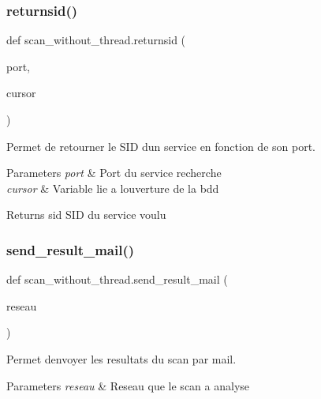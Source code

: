 \subsubsection{\texorpdfstring{returnsid()}{returnsid()}}
{\footnotesize\ttfamily def scan\+\_\+without\+\_\+thread.\+returnsid (\begin{DoxyParamCaption}\item[{}]{port,  }\item[{}]{cursor }\end{DoxyParamCaption})}



Permet de retourner le S\+ID d\textquotesingle{}un service en fonction de son port. 


\begin{DoxyParams}{Parameters}
{\em port} & Port du service recherche \\
\hline
{\em cursor} & Variable lie a l\textquotesingle{}ouverture de la bdd \\
\hline
\end{DoxyParams}
\begin{DoxyReturn}{Returns}
sid S\+ID du service voulu 
\end{DoxyReturn}
\hypertarget{namespacescan__without__thread_adc66d25732d159cb57f0e3aaf5e71e50}{}\label{namespacescan__without__thread_adc66d25732d159cb57f0e3aaf5e71e50} 
\subsubsection{\texorpdfstring{send\+\_\+result\+\_\+mail()}{send\_result\_mail()}}
{\footnotesize\ttfamily def scan\+\_\+without\+\_\+thread.\+send\+\_\+result\+\_\+mail (\begin{DoxyParamCaption}\item[{}]{reseau }\end{DoxyParamCaption})}



Permet d\textquotesingle{}envoyer les resultats du scan par mail. 


\begin{DoxyParams}{Parameters}
{\em reseau} & Reseau que le scan a analyse \\
\hline
\end{DoxyParams}
\hypertarget{namespacescan__without__thread_ad65f26909b7969fdaab937bbf27cf329}{}\label{namespacescan__without__thread_ad65f26909b7969fdaab937bbf27cf329} 

